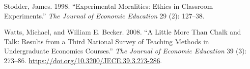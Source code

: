 \documentclass[
]{article}
\newlength{\cslhangindent}
\newlength{\cslentryspacingunit} %
\newenvironment{CSLReferences}[2] %
 {%
  \setlength{\parindent}{0pt}
  \ifodd #1
  \let\oldpar\par
  \def\par{\hangindent=\cslhangindent\oldpar}
  \fi
  \setlength{\parskip}{#2\cslentryspacingunit}
 }%
 {}
\begin{document}
\begin{CSLReferences}{1}{0}
\leavevmode{}%
Stodder, James. 1998. {``Experimental Moralities: {Ethics} in Classroom
Experiments.''} \emph{The Journal of Economic Education} 29 (2):
127--38.

\leavevmode{}%
Watts, Michael, and William E. Becker. 2008. {``A {Little} {More} Than
{Chalk} and {Talk}: {Results} from a {Third} {National} {Survey} of
{Teaching} {Methods} in {Undergraduate} {Economics} {Courses}.''}
\emph{The Journal of Economic Education} 39 (3): 273--86.
\url{https://doi.org/10.3200/JECE.39.3.273-286}.

\end{CSLReferences}
\end{document}
